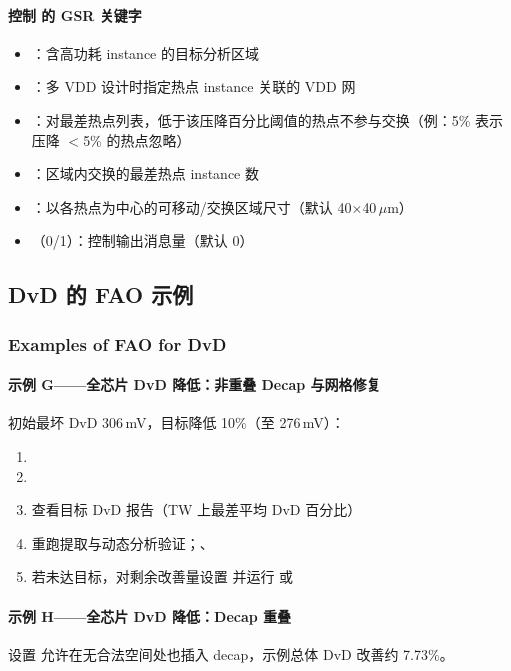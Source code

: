 \paragraph{控制  的 GSR 关键字}
\begin{itemize}
  \item {}：含高功耗 instance 的目标分析区域
  \item {}：多 VDD 设计时指定热点 instance 关联的 VDD 网
  \item {}：对最差热点列表，低于该压降百分比阈值的热点不参与交换（例：5\% 表示压降 $<$5\% 的热点忽略）
  \item {}：区域内交换的最差热点 instance 数
  \item {}：以各热点为中心的可移动/交换区域尺寸（默认 40$\times$40\,$\mu$m）
  \item {}（0/1）：控制输出消息量（默认 0）
\end{itemize}


\subsection{DvD 的 FAO 示例}
\subsubsection*{Examples of FAO for DvD}

\paragraph{示例 G——全芯片 DvD 降低：非重叠 Decap 与网格修复}
初始最坏 DvD 306\,mV，目标降低 10\%（至 276\,mV）：
\begin{enumerate}
  \item {}
  \item {}
  \item 查看目标 DvD 报告（TW 上最差平均 DvD 百分比）
  \item 重跑提取与动态分析验证；、
  \item 若未达目标，对剩余改善量设置  并运行  或 
\end{enumerate}

\paragraph{示例 H——全芯片 DvD 降低：Decap 重叠}
设置  允许在无合法空间处也插入 decap，示例总体 DvD 改善约 7.73\%。
